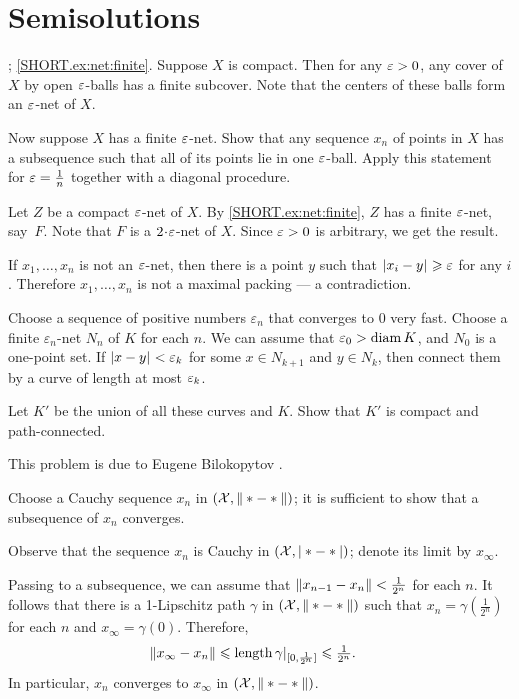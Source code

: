 
\chapter{Semisolutions}

\parbf{\ref{ex:net}};
\ref{SHORT.ex:net:finite}.
Suppose $X$ is compact.
Then for any $\varepsilon>0$, any cover of $X$ by open $\varepsilon$-balls has a finite subcover.
Note that the centers of these balls form an $\varepsilon$-net of $X$.

Now suppose $X$ has a finite $\varepsilon$-net.
Show that any sequence $x_n$ of points in $X$ has a subsequence such that all of its points lie in one $\varepsilon$-ball.
Apply this statement for $\varepsilon=\tfrac1n$ together with a diagonal procedure.

Let $Z$ be a compact $\varepsilon$-net of $X$.
By \ref{SHORT.ex:net:finite}, $Z$ has a finite $\varepsilon$-net, say~$F$.
Note that $F$ is a $2\cdot\eps$-net of $X$.
Since $\varepsilon>0$ is arbitrary, we get the result.

 If $x_1,\dots,x_n$ is not an $\varepsilon$-net, then there is a point $y$ such that $\dist{x_i}{y}{}\ge\eps$ for any $i$.
Therefore $x_1,\dots,x_n$ is not a maximal packing --- a contradiction.

Choose a sequence of positive numbers $\varepsilon_n$ that converges to $0$ very fast.
Choose a finite $\varepsilon_n$-net $N_n$ of $K$ for each $n$.
We can assume that $\varepsilon_0>\operatorname{\rm diam}\nolimits K$, and $N_0$ is a one-point set.
If $\dist{x}{y}{}<\eps_k$ for some $x\in N_{k+1}$ and $y\in N_{k}$, then connect them by a curve of length at most $\varepsilon_k$.

Let $K'$ be the union of all these curves and $K$.
Show that $K'$ is compact and path-connected.

 This problem is due to Eugene Bilokopytov \cite{bilokopytov}.

Choose a Cauchy sequence $x_n$ in $(\spc{X},\|*\z-*\|)$; it is sufficient to show that a subsequence of $x_n$ converges.

Observe that the sequence $x_n$ is Cauchy in $(\mathcal{X},|*-*|)$;
denote its limit by $x_\infty$.

Passing to a subsequence, we can assume that $\|x_{n-1}-x_{n}\|\z<\tfrac1{2^{n}}$ for each $n$.
It follows that there is a 1-Lipschitz path $\gamma$ in $(\mathcal{X},\|*-*\|)$ such that $x_n=\gamma(\tfrac1{2^n})$ for each $n$ and $x_\infty=\gamma(0)$.
Therefore,
\begin{align*}
\|x_\infty-x_n\|&\leqslant \mathop{\rm length}\nolimits\gamma|_{[0,\frac1{2^n}]}\leqslant \tfrac1{2^n}.
\end{align*}
In particular, $x_n$ converges to $x_\infty$ in $(\spc{X},\|*\z-*\|)$.

